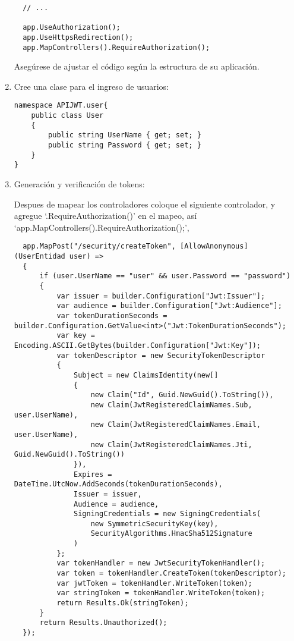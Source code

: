 \documentclass[executivepaper]{article}
\begin{document}
\begin{enumerate}
\begin{lstlisting}
  // ...

  app.UseAuthorization();
  app.UseHttpsRedirection();
  app.MapControllers().RequireAuthorization();
\end{lstlisting}

  Asegúrese de ajustar el código según la estructura de su aplicación.

  \item Cree una clase para el ingreso de usuarios:
  \begin{lstlisting}
namespace APIJWT.user{
    public class User
    {
        public string UserName { get; set; }
        public string Password { get; set; }
    }
}
\end{lstlisting}
  \item Generación y verificación de tokens:
  
  Despues de mapear los controladores coloque el siguiente controlador, y agregue \enquote*{.RequireAuthorization()} en el mapeo, así \enquote*{app.MapControllers().RequireAuthorization();}, 

  \begin{lstlisting}
  app.MapPost("/security/createToken", [AllowAnonymous] (UserEntidad user) =>
  {
      if (user.UserName == "user" && user.Password == "password")
      {
          var issuer = builder.Configuration["Jwt:Issuer"];
          var audience = builder.Configuration["Jwt:Audience"];
          var tokenDurationSeconds = builder.Configuration.GetValue<int>("Jwt:TokenDurationSeconds");
          var key = Encoding.ASCII.GetBytes(builder.Configuration["Jwt:Key"]);
          var tokenDescriptor = new SecurityTokenDescriptor
          {
              Subject = new ClaimsIdentity(new[]
              {
                  new Claim("Id", Guid.NewGuid().ToString()),
                  new Claim(JwtRegisteredClaimNames.Sub, user.UserName),
                  new Claim(JwtRegisteredClaimNames.Email, user.UserName),
                  new Claim(JwtRegisteredClaimNames.Jti, Guid.NewGuid().ToString())
              }),
              Expires = DateTime.UtcNow.AddSeconds(tokenDurationSeconds),
              Issuer = issuer,
              Audience = audience,
              SigningCredentials = new SigningCredentials(
                  new SymmetricSecurityKey(key),
                  SecurityAlgorithms.HmacSha512Signature
              )
          };
          var tokenHandler = new JwtSecurityTokenHandler();
          var token = tokenHandler.CreateToken(tokenDescriptor);
          var jwtToken = tokenHandler.WriteToken(token);
          var stringToken = tokenHandler.WriteToken(token);
          return Results.Ok(stringToken);
      }
      return Results.Unauthorized();
  });
\end{lstlisting}


\end{enumerate}
\end{document}
